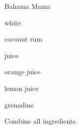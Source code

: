 \begin{recipe}{Bahama Mama}{}{}

\begin{ingredients}
\item {} white 
\item \C{\threequarter} coconut rum
\item \C{\quarter} 
\item {}  juice
\item {} orange juice
\item \C{\quarter} lemon juice
\item \C{\quarter} grenadine
\end{ingredients}

\begin{directions}
\item Combine all ingredients.
\end{directions}

\end{recipe}
